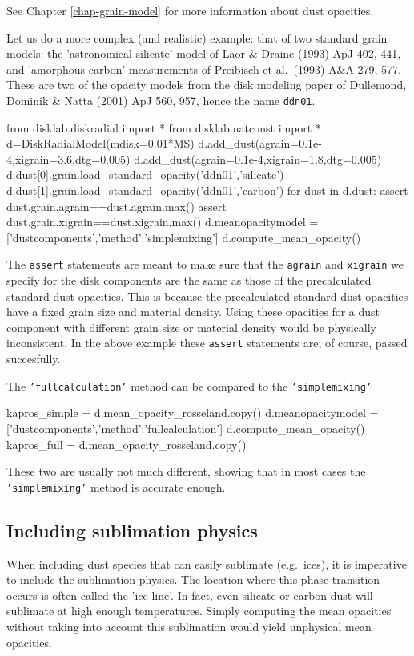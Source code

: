 \documentclass{book}
\newcommand{\code}[1]{{\small\tt #1}}
\begin{document}
See Chapter \ref{chap-grain-model} for more information about dust opacities.

Let us do a more complex (and realistic) example: that of two standard grain
models: the 'astronomical silicate' model of Laor \& Draine (1993) ApJ 402, 441,
and 'amorphous carbon' measurements of Preibisch et al.\ (1993) A\&A 279, 577.
These are two of the opacity models from the disk modeling paper of Dullemond,
Dominik \& Natta (2001) ApJ 560, 957, hence the name \code{ddn01}.
\begin{codebox}
from disklab.diskradial import *
from disklab.natconst import *
d=DiskRadialModel(mdisk=0.01*MS)
d.add_dust(agrain=0.1e-4,xigrain=3.6,dtg=0.005)
d.add_dust(agrain=0.1e-4,xigrain=1.8,dtg=0.005)
d.dust[0].grain.load_standard_opacity('ddn01','silicate')
d.dust[1].grain.load_standard_opacity('ddn01','carbon')
for dust in d.dust:
   assert dust.grain.agrain==dust.agrain.max()
   assert dust.grain.xigrain==dust.xigrain.max()
d.meanopacitymodel = ['dustcomponents',{'method':'simplemixing'}]
d.compute_mean_opacity()
\end{codebox}
The \code{assert} statements are meant to make sure that the \code{agrain} and
\code{xigrain} we specify for the disk components are the same as those of the
precalculated standard dust opacities. This is because the
precalculated standard dust opacities have a fixed grain size and material
density. Using these opacities for a dust component with different grain size
or material density would be physically inconsistent. In the above example
these \code{assert} statements are, of course, passed succesfully.

The \code{'fullcalculation'} method can be compared to the \code{'simplemixing'}
\begin{codebox}
kapros_simple = d.mean_opacity_rosseland.copy()
d.meanopacitymodel = ['dustcomponents',{'method':'fullcalculation'}]
d.compute_mean_opacity()
kapros_full = d.mean_opacity_rosseland.copy()
\end{codebox}
These two are usually not much different, showing that in most cases
the \code{'simplemixing'} method is accurate enough.

\subsection{Including sublimation physics}
When including dust species that can easily sublimate (e.g.\ ices), it is
imperative to include the sublimation physics. The location where this phase
transition occurs is often called the 'ice line'. In fact, even silicate or
carbon dust will sublimate at high enough temperatures. Simply computing the
mean opacities without taking into account this sublimation would yield
unphysical mean opacities.
\end{document}
